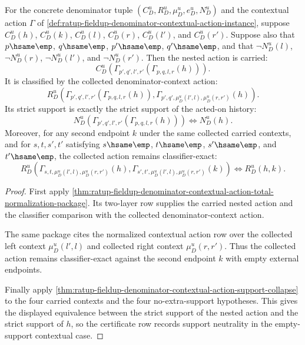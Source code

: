 \begin{theorem}
\label{thm:ratup-fieldup-denominator-total-normalization-support-collapse-row}
For the concrete denominator tuple
$(C_D^u,R_D^u,\mu_D^u,e_D^u,N_D^u)$ and the contextual action $\Gamma$ of
\autoref{def:ratup-fieldup-denominator-contextual-action-instance}, suppose
$C_D^u(h)$, $C_D^u(k)$, $C_D^u(l)$, $C_D^u(r)$, $C_D^u(l')$, and
$C_D^u(r')$. Suppose also that $p\hsame\emp$, $q\hsame\emp$,
$p'\hsame\emp$, $q'\hsame\emp$, and that
$\neg N_D^u(l)$, $\neg N_D^u(r)$, $\neg N_D^u(l')$, and
$\neg N_D^u(r')$. Then the nested action is carried:
$$
C_D^u(\Gamma_{p',q',l',r'}(\Gamma_{p,q,l,r}(h))).
$$
It is classified by the collected denominator-context action:
$$
R_D^u(\Gamma_{p',q',l',r'}(\Gamma_{p,q,l,r}(h)),
\Gamma_{p',q',\mu_D^u(l',l),\mu_D^u(r,r')}(h)).
$$
Its strict support is exactly the strict support of the acted-on history:
$$
N_D^u(\Gamma_{p',q',l',r'}(\Gamma_{p,q,l,r}(h)))
\Longleftrightarrow
N_D^u(h).
$$
Moreover, for any second endpoint $k$ under the same collected carried contexts,
and for $s,t,s',t'$ satisfying $s\hsame\emp$, $t\hsame\emp$,
$s'\hsame\emp$, and $t'\hsame\emp$, the collected action remains
classifier-exact:
$$
R_D^u(\Gamma_{s,t,\mu_D^u(l',l),\mu_D^u(r,r')}(h),
\Gamma_{s',t',\mu_D^u(l',l),\mu_D^u(r,r')}(k))
\Longleftrightarrow R_D^u(h,k).
$$
\end{theorem}
\begin{proof}
First apply
\autoref{thm:ratup-fieldup-denominator-contextual-action-total-normalization-package}.
Its two-layer row supplies the carried nested action and the classifier
comparison with the collected denominator-context action.

The same package cites the normalized contextual action row over the collected
left context $\mu_D^u(l',l)$ and collected right context $\mu_D^u(r,r')$.
Thus the collected action remains classifier-exact against the second endpoint
$k$ with empty external endpoints.

Finally apply
\autoref{thm:ratup-fieldup-denominator-contextual-action-support-collapse} to
the four carried contexts and the four no-extra-support hypotheses. This gives
the displayed equivalence between the strict support of the nested action and
the strict support of $h$, so the certificate row records support neutrality in
the empty-support contextual case.
\end{proof}
